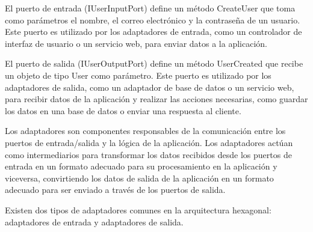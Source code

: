 \documentclass[executivepaper]{article}
\begin{document}
El puerto de entrada (IUserInputPort) define un método CreateUser que toma como parámetros el nombre, el correo electrónico y la contraseña de un usuario. Este puerto es utilizado por los adaptadores de entrada, como un controlador de interfaz de usuario o un servicio web, para enviar datos a la aplicación.

El puerto de salida (IUserOutputPort) define un método UserCreated que recibe un objeto de tipo User como parámetro. Este puerto es utilizado por los adaptadores de salida, como un adaptador de base de datos o un servicio web, para recibir datos de la aplicación y realizar las acciones necesarias, como guardar los datos en una base de datos o enviar una respuesta al cliente.

Los adaptadores son componentes responsables de la comunicación entre los puertos de entrada/salida y la lógica de la aplicación. Los adaptadores actúan como intermediarios para transformar los datos recibidos desde los puertos de entrada en un formato adecuado para su procesamiento en la aplicación y viceversa, convirtiendo los datos de salida de la aplicación en un formato adecuado para ser enviado a través de los puertos de salida.

Existen dos tipos de adaptadores comunes en la arquitectura hexagonal: adaptadores de entrada y adaptadores de salida.
\end{document}
